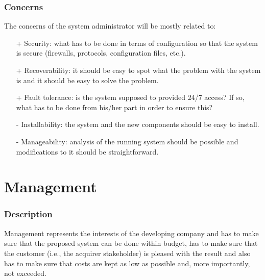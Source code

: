 \subsubsection{Concerns}
The concerns of the system administrator will be mostly related to:
\begin{itemize}
\item[+] Security: what has to be done in terms of configuration
so that the system is secure (firewalls, protocols, configuration files,
etc.).
\item[+] Recoverability: it should be easy to spot what the problem
with the system is and it should be easy to solve the problem.
\item[+] Fault tolerance: is the system supposed to provided 24/7
access? If so, what has to be done from his/her part in order to ensure
this?
\item[-] Installability: the system and the new components should
be easy to install.
\item[-] Manageability: analysis of the running system should be
possible and modifications to it should be straightforward.
\end{itemize}

\section{Management}

\subsubsection{Description}
Management represents the interests of the developing company and
has to make sure that the proposed system can be done within
budget, has to make sure that the customer (i.e., the acquirer stakeholder)
is pleased with the result and also has to make sure that costs are
kept as low as possible and, more importantly, not exceeded.

